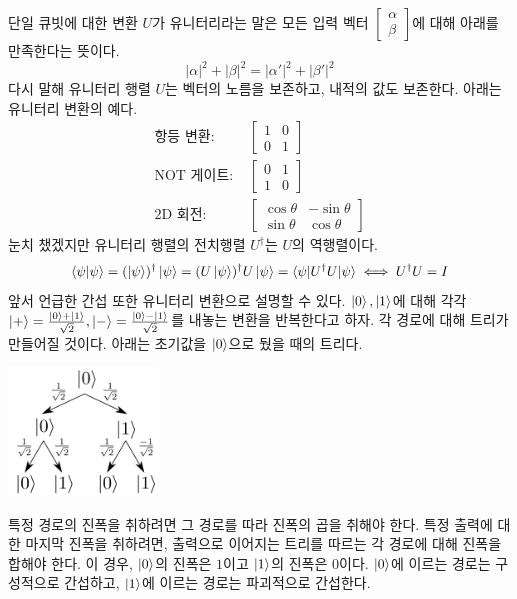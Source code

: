 \documentclass[a4paper,chapter,atbegshi]{oblivoir}
\begin{document}
단일 큐빗에 대한 변환 $U$가 유니터리라는 말은 모든 입력 벡터 $\begin{bmatrix}
\alpha\\\beta\end{bmatrix}$에 대해 아래를 만족한다는 뜻이다.
\[
  |\alpha|^2+|\beta|^2 = |\alpha'|^2+|\beta'|^2
\]
다시 말해 유니터리 행렬 $U$는 벡터의 노름을 보존하고, 내적의 값도 보존한다.
아래는 유니터리 변환의 예다.
\begin{align*}
  \textrm{항등 변환: }& \begin{bmatrix}1&0\\0&1\end{bmatrix} \\
  \textrm{NOT 게이트: }&\begin{bmatrix}0&1\\1&0\end{bmatrix}\\
  \textrm{2D 회전: }&\begin{bmatrix}\cos\theta &-\sin\theta\\\sin\theta &\cos\theta\end{bmatrix}
\end{align*}
눈치 챘겠지만 유니터리 행렬의 전치행렬 $U^{\dagger}$는 $U$의 역행렬이다.
\begin{equation}
  \braket{\psi|\psi}=(\ket{\psi})^{\dagger}\ket{\psi}=(U\ket{\psi})^{\dagger}U\ket{\psi}=\braket{\psi|U^{\dagger}U|\psi} \iff U^{\dagger}U= I
\end{equation}
앞서 언급한 간섭 또한 유니터리 변환으로 설명할 수 있다. $\ket0,\ket1$에
대해 각각 $\ket+=\frac{\ket0+\ket1}{\sqrt2},\ket-=\frac{\ket0-\ket1}{\sqrt2}$를
내놓는 변환을 반복한다고 하자. 각 경로에 대해 트리가 만들어질 것이다. 아래는
초기값을 $\ket0$으로 뒀을 때의 트리다.

\begin{center}
  \includegraphics[width=0.3\textwidth]{qis001}
\end{center}

특정 경로의 진폭을 취하려면 그 경로를 따라 진폭의
곱을 취해야 한다. 특정 출력에 대한 마지막 진폭을 취하려면, 출력으로 이어지는
트리를 따르는 각 경로에 대해 진폭을 합해야 한다. 이 경우, $\ket0$의 진폭은 
$1$이고 $\ket1$의 진폭은 $0$이다. $\ket0$에 이르는 경로는 구성적으로 간섭하고,
$\ket1$에 이르는 경로는 파괴적으로 간섭한다.
\end{document}
